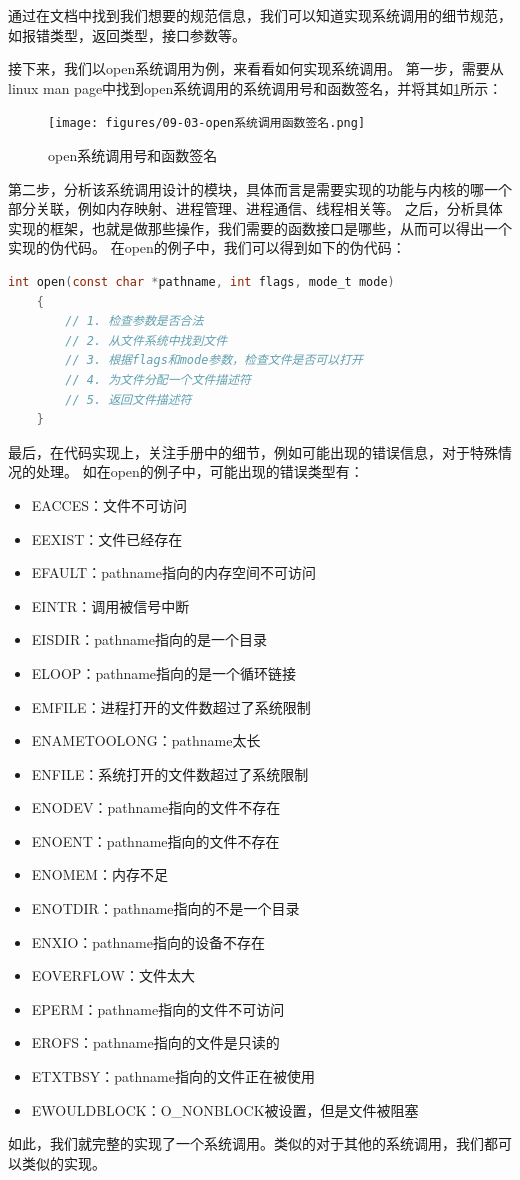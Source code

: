通过在文档中找到我们想要的规范信息，我们可以知道实现系统调用的细节规范，如报错类型，返回类型，接口参数等。

接下来，我们以open系统调用为例，来看看如何实现系统调用。
第一步，需要从linux man page中找到open系统调用的系统调用号和函数签名，并将其如\ref{fig:opensyscall1}所示：
\begin{figure}[H]
  \centering
  \texttt{[image: figures/09-03-open系统调用函数签名.png]}
  \caption{open系统调用号和函数签名}
  \label{fig:opensyscall1}
\end{figure}

第二步，分析该系统调用设计的模块，具体而言是需要实现的功能与内核的哪一个部分关联，例如内存映射、进程管理、进程通信、线程相关等。
之后，分析具体实现的框架，也就是做那些操作，我们需要的函数接口是哪些，从而可以得出一个实现的伪代码。
在open的例子中，我们可以得到如下的伪代码：
\begin{lstlisting}[language=c]
    int open(const char *pathname, int flags, mode_t mode)
    {
        // 1. 检查参数是否合法
        // 2. 从文件系统中找到文件
        // 3. 根据flags和mode参数，检查文件是否可以打开
        // 4. 为文件分配一个文件描述符
        // 5. 返回文件描述符
    }
\end{lstlisting}

最后，在代码实现上，关注手册中的细节，例如可能出现的错误信息，对于特殊情况的处理。
如在open的例子中，可能出现的错误类型有：
\begin{itemize}
    \item EACCES：文件不可访问
    \item EEXIST：文件已经存在
    \item EFAULT：pathname指向的内存空间不可访问
    \item EINTR：调用被信号中断
    \item EISDIR：pathname指向的是一个目录
    \item ELOOP：pathname指向的是一个循环链接
    \item EMFILE：进程打开的文件数超过了系统限制
    \item ENAMETOOLONG：pathname太长
    \item ENFILE：系统打开的文件数超过了系统限制
    \item ENODEV：pathname指向的文件不存在
    \item ENOENT：pathname指向的文件不存在
    \item ENOMEM：内存不足
    \item ENOTDIR：pathname指向的不是一个目录
    \item ENXIO：pathname指向的设备不存在
    \item EOVERFLOW：文件太大
    \item EPERM：pathname指向的文件不可访问
    \item EROFS：pathname指向的文件是只读的
    \item ETXTBSY：pathname指向的文件正在被使用
    \item EWOULDBLOCK：O\_NONBLOCK被设置，但是文件被阻塞
\end{itemize}

如此，我们就完整的实现了一个系统调用。类似的对于其他的系统调用，我们都可以类似的实现。